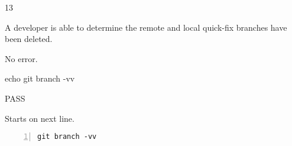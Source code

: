 \begin{description}[align=right,leftmargin=3.2cm,labelindent=3.0cm]
\item[Step:] 13
\item[Confirm:] A developer is able to determine the remote and local quick-fix branches have been deleted.
\item[Expectation:] No error.
\item[Command:] echo git  branch -vv
\item[Test Result:] PASS
\item[Evidence:] Starts on next line.
\end{description}
\begin{lstlisting}[numbers=left]
git branch -vv

\end{lstlisting}
